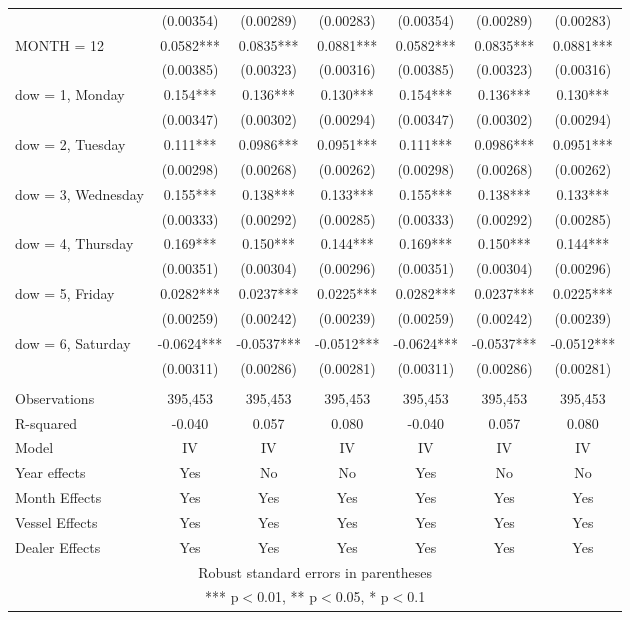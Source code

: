 \begin{tabular}{lcccccc}
 & (0.00354) & (0.00289) & (0.00283) & (0.00354) & (0.00289) & (0.00283) \\
MONTH = 12 & 0.0582*** & 0.0835*** & 0.0881*** & 0.0582*** & 0.0835*** & 0.0881*** \\
 & (0.00385) & (0.00323) & (0.00316) & (0.00385) & (0.00323) & (0.00316) \\
dow = 1, Monday & 0.154*** & 0.136*** & 0.130*** & 0.154*** & 0.136*** & 0.130*** \\
 & (0.00347) & (0.00302) & (0.00294) & (0.00347) & (0.00302) & (0.00294) \\
dow = 2, Tuesday & 0.111*** & 0.0986*** & 0.0951*** & 0.111*** & 0.0986*** & 0.0951*** \\
 & (0.00298) & (0.00268) & (0.00262) & (0.00298) & (0.00268) & (0.00262) \\
dow = 3, Wednesday & 0.155*** & 0.138*** & 0.133*** & 0.155*** & 0.138*** & 0.133*** \\
 & (0.00333) & (0.00292) & (0.00285) & (0.00333) & (0.00292) & (0.00285) \\
dow = 4, Thursday & 0.169*** & 0.150*** & 0.144*** & 0.169*** & 0.150*** & 0.144*** \\
 & (0.00351) & (0.00304) & (0.00296) & (0.00351) & (0.00304) & (0.00296) \\
dow = 5, Friday & 0.0282*** & 0.0237*** & 0.0225*** & 0.0282*** & 0.0237*** & 0.0225*** \\
 & (0.00259) & (0.00242) & (0.00239) & (0.00259) & (0.00242) & (0.00239) \\
dow = 6, Saturday & -0.0624*** & -0.0537*** & -0.0512*** & -0.0624*** & -0.0537*** & -0.0512*** \\
 & (0.00311) & (0.00286) & (0.00281) & (0.00311) & (0.00286) & (0.00281) \\
 &  &  &  &  &  &  \\
Observations & 395,453 & 395,453 & 395,453 & 395,453 & 395,453 & 395,453 \\
R-squared & -0.040 & 0.057 & 0.080 & -0.040 & 0.057 & 0.080 \\
Model & IV & IV & IV & IV & IV & IV \\
Year effects & Yes & No & No & Yes & No & No \\
Month Effects & Yes & Yes & Yes & Yes & Yes & Yes \\
Vessel Effects & Yes & Yes & Yes & Yes & Yes & Yes \\
 Dealer Effects & Yes & Yes & Yes & Yes & Yes & Yes \\ \hline
\multicolumn{7}{c}{ Robust standard errors in parentheses} \\
\multicolumn{7}{c}{ *** p$<$0.01, ** p$<$0.05, * p$<$0.1} \\
\end{tabular}
